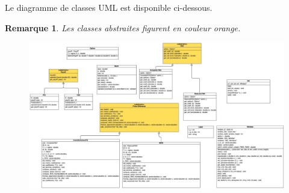 \documentclass[11pt,a4paper]{article}
\theoremstyle{plain}
\newtheorem{rmq}{Remarque}
\begin{document}
Le diagramme de classes UML est disponible ci-dessous.
\begin{rmq}
Les classes abstraites figurent en couleur orange.
\end{rmq}
\begin{landscape}
\begin{figure}
    \centering
    \includegraphics[scale = 0.4]{img/uml_diagram.jpg}
\end{figure}
\end{landscape}
\end{document}
